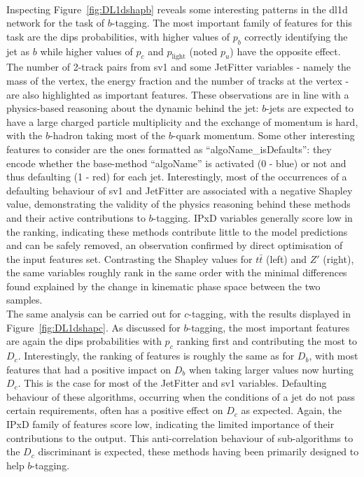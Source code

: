 \paragraph{}Inspecting Figure~\ref{fig:DL1dshapb} reveals some interesting patterns in the \gls{dl1d} network for the task of $b$-tagging. The most important family of features for this task are the \gls{dips} probabilities, with higher values of $p_b$ correctly identifying the jet as $b$ while higher values of $p_c$ and $p_{\textrm{light}}$ (noted $p_u$) have the opposite effect. The number of 2-track pairs from \gls{sv1} and some JetFitter variables - namely the mass of the vertex, the energy fraction and the number of tracks at the vertex - are also highlighted as important features. These observations are in line with a physics-based reasoning about the dynamic behind the jet: $b$-jets are expected to have a large charged particle multiplicity and the exchange of momentum is hard, with the $b$-hadron taking most of the $b$-quark momentum. Some other interesting features to consider are the ones formatted as  ``algoName\_isDefaults'': they encode whether the base-method ``algoName'' is activated (0 - blue) or not and thus defaulting (1 - red) for each jet. Interestingly, most of the occurrences of a defaulting behaviour of \gls{sv1} and JetFitter are associated with a negative Shapley value, demonstrating the validity of the physics reasoning behind these methods and their active contributions to $b$-tagging. IPxD variables generally score low in the ranking, indicating these methods contribute little to the model predictions and can be safely removed, an observation confirmed by direct optimisation of the input features set. Contrasting the Shapley values for $t\bar{t}$ (left) and $Z'$ (right), the same variables roughly rank in the same order with the minimal differences found explained by the change in kinematic phase space between the two samples. \\

The same analysis can be carried out for $c$-tagging, with the results displayed in Figure~\ref{fig:DL1dshapc}. As discussed for $b$-tagging, the most important features are again the \gls{dips} probabilities with $p_c$ ranking first and contributing the most to $D_c$. Interestingly, the ranking of features is roughly the same as for $D_b$, with most features that had a positive impact on $D_b$ when taking larger values now hurting $D_c$. This is the case for most of the JetFitter and \gls{sv1} variables. Defaulting behaviour of these algorithms, occurring when the conditions of a jet do not pass certain requirements, often has a positive effect on $D_c$ as expected. Again, the IPxD family of features score low, indicating the limited importance of their contributions to the output. This anti-correlation behaviour of sub-algorithms to the $D_c$ discriminant is expected, these methods having been primarily designed to help $b$-tagging. 

